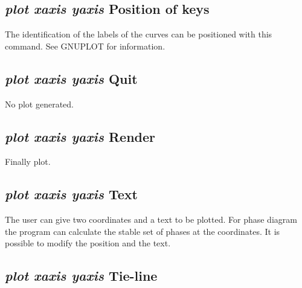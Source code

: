 \documentclass[12pt]{article}
\begin{document}
\subsection{{\em plot xaxis yaxis} Position of keys}

The identification of the labels of the curves can be positioned
with this command.  See GNUPLOT for information.

\subsection{{\em plot xaxis yaxis} Quit}

No plot generated.

\subsection{{\em plot xaxis yaxis} Render}

Finally plot.

\subsection{{\em plot xaxis yaxis} Text}

The user can give two coordinates and a text to be plotted.  For phase
diagram the program can calculate the stable set of phases at the
coordinates.  It is possible to modify the position and the text.

\subsection{{\em plot xaxis yaxis} Tie-line}
\end{document}
